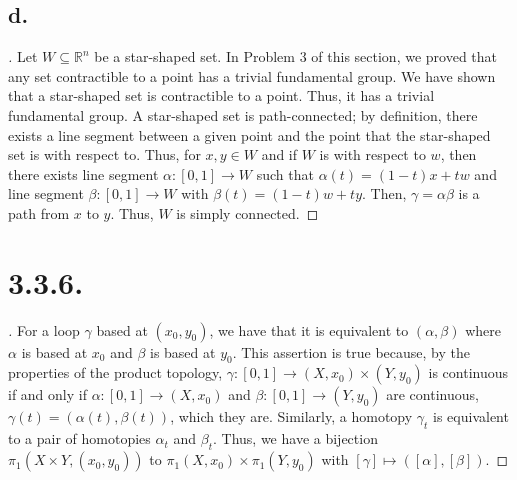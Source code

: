 \documentclass{article}
\begin{document}
\subsection*{d.}
\begin{proof}[\unskip\nopunct]
   Let $W \subseteq \mathbb{R}^n$ be a star-shaped set. In 
   Problem $3$ of this section, we proved that any set contractible to a point has a trivial fundamental group. 
   We have shown that a star-shaped set is contractible to a point. Thus, it has a trivial fundamental group. A star-shaped set is path-connected; by definition, there exists a line segment between a given point and the point that the star-shaped set is with respect to. Thus, for $x, y \in W$ and if $W$ is with respect to $w$, then there exists line segment $\alpha:[0, 1] \to W$ such that $\alpha(t) = (1 - t)x + tw$ and line segment $\beta:[0, 1] \to W$ with $\beta(t) = (1 - t)w + ty$. Then, $\gamma = \alpha \beta$ is a path from $x$ to $y$. Thus, $W$ is simply connected. 
    

\end{proof}

\section*{3.3.6.} %
\begin{proof}[\unskip\nopunct]
   
   For a loop $\gamma$ based at $(x_0, y_0)$, we have that it is equivalent to $(\alpha, \beta)$ where $\alpha$ is based at $x_0$ and $\beta$ is based at $y_0$. This assertion is true because, by the properties 
   of the product topology, $\gamma:[0, 1] \to (X, x_0) \times (Y, y_0)$ is continuous if and only if $\alpha:[0, 1] \to (X, x_0)$ and $\beta:[0, 1] \to (Y, y_0)$ are continuous, $\gamma(t) = (\alpha(t), \beta(t))$, which they are. 
   Similarly, a homotopy $\gamma_t$ is equivalent to a pair of homotopies $\alpha_t$ and $\beta_t$. Thus, we have a bijection $\pi_1(X \times Y, (x_0, y_0))$ to $\pi_1(X, x_0) \times \pi_1(Y, y_0)$ with $[\gamma] \mapsto ([\alpha], [\beta])$. 



\end{proof}
\end{document}
